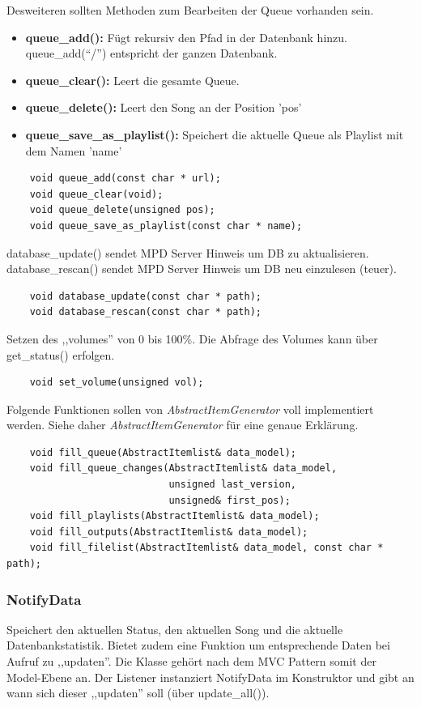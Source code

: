 Desweiteren sollten Methoden zum Bearbeiten der Queue vorhanden sein.
\begin{itemize}
    \item \textbf{queue\_add():} Fügt rekursiv den Pfad in der Datenbank hinzu. queue\_add(``/'') entspricht der ganzen Datenbank.
    \item \textbf{queue\_clear():} Leert die gesamte Queue.
    \item \textbf{queue\_delete():} Leert den Song an der Position 'pos'
    \item \textbf{queue\_save\_as\_playlist():} Speichert die aktuelle Queue als Playlist mit dem Namen 'name'
\end{itemize}
\begin{verbatim}
    void queue_add(const char * url);
    void queue_clear(void);
    void queue_delete(unsigned pos);
    void queue_save_as_playlist(const char * name);
\end{verbatim}

database\_update() sendet MPD Server Hinweis um DB zu aktualisieren.
database\_rescan() sendet MPD Server Hinweis um DB neu einzulesen (teuer).
\begin{verbatim}
    void database_update(const char * path);
    void database_rescan(const char * path);
\end{verbatim}

Setzen des ,,volumes'' von 0 bis 100\%.
Die Abfrage des Volumes kann über get\_status() erfolgen.
\begin{verbatim}
    void set_volume(unsigned vol);
\end{verbatim}

Folgende Funktionen sollen von \emph{AbstractItemGenerator} voll implementiert werden.
Siehe daher \emph{AbstractItemGenerator} für eine genaue Erklärung.
\begin{verbatim}
    void fill_queue(AbstractItemlist& data_model);
    void fill_queue_changes(AbstractItemlist& data_model,
                            unsigned last_version,
                            unsigned& first_pos);
    void fill_playlists(AbstractItemlist& data_model);
    void fill_outputs(AbstractItemlist& data_model);
    void fill_filelist(AbstractItemlist& data_model, const char * path);
\end{verbatim}

\subsubsection{NotifyData}
Speichert den aktuellen Status, den aktuellen Song und die aktuelle Datenbankstatistik.
Bietet zudem eine Funktion um entsprechende Daten bei Aufruf zu ,,updaten''.
Die Klasse gehört nach dem MVC Pattern somit der Model-Ebene an.
Der Listener instanziert NotifyData im Konstruktor und gibt an wann sich dieser ,,updaten'' soll (über update\_all()).
\\        

